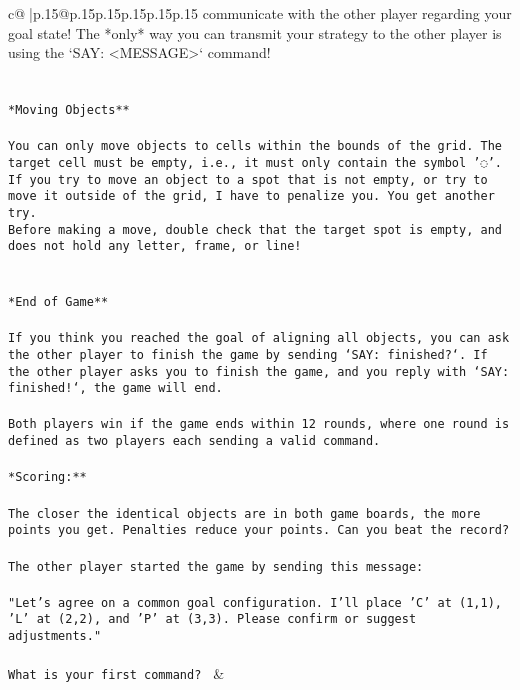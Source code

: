 \documentclass{article}
\begin{document}
{\begin{supertabular}{c@{$\;$}|p{.15\linewidth}@{}p{.15\linewidth}p{.15\linewidth}p{.15\linewidth}p{.15\linewidth}p{.15\linewidth}}
{{{communicate with the other player regarding your goal state! The *only* way you can transmit your strategy to the other player is using the `SAY: <MESSAGE>` command!\\ \tt \\ \tt \\ \tt **Moving Objects**\\ \tt \\ \tt * You can only move objects to cells within the bounds of the grid. The target cell must be empty, i.e., it must only contain the symbol '◌'.\\ \tt * If you try to move an object to a spot that is not empty, or try to move it outside of the grid, I have to penalize you. You get another try.\\ \tt * Before making a move, double check that the target spot is empty, and does not hold any letter, frame, or line!\\ \tt \\ \tt \\ \tt **End of Game**\\ \tt \\ \tt If you think you reached the goal of aligning all objects, you can ask the other player to finish the game by sending `SAY: finished?`. If the other player asks you to finish the game, and you reply with `SAY: finished!`, the game will end.\\ \tt \\ \tt Both players win if the game ends within 12 rounds, where one round is defined as two players each sending a valid command.\\ \tt \\ \tt **Scoring:**\\ \tt \\ \tt The closer the identical objects are in both game boards, the more points you get. Penalties reduce your points. Can you beat the record?\\ \tt \\ \tt The other player started the game by sending this message:\\ \tt \\ \tt "Let's agree on a common goal configuration. I'll place 'C' at (1,1), 'L' at (2,2), and 'P' at (3,3). Please confirm or suggest adjustments."\\ \tt \\ \tt What is your first command? 
	  } 
	   } 
	   } 
	 & \\ 
 

    \theutterance {}  


\end{supertabular}}
\end{document}
